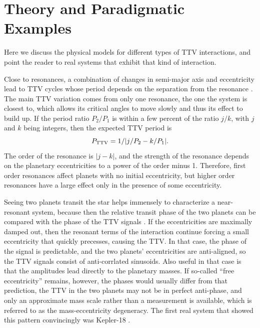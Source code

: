 \documentclass[graybox,natbib,nosecnum]{svmult}
\begin{document}
\section{Theory and Paradigmatic Examples} 

Here we discuss the physical models for different types of TTV interactions, and point the reader to real systems that exhibit that kind of interaction. 

Close to resonances, a combination of changes in semi-major axis and eccentricity lead to TTV cycles whose period depends on the separation from the resonance \citep{2012ApJ...761..122L}.  The main TTV variation comes from only one resonance, the one the system is closest to, which allows its critical angles to move slowly and thus its effect to build up.  If the period ratio $P_2/P_1$ is within a few percent of the ratio $j/k$, with $j$ and $k$ being integers, then the expected TTV period is 
\begin{equation}
P_{\rm TTV} = 1/|j/P_2-k/P_1|. \label{eqn:pttv}
\end{equation}
The order of the resonance is $|j-k|$, and the strength of the resonance depends on the planetary eccentricities to a power of the order minus 1.  Therefore, first order resonances affect planets with no initial eccentricity, but higher order resonances have a large effect only in the presence of some eccentricity. 

Seeing two planets transit the star helps immensely to characterize a near-resonant system, because then the relative transit phase of the two planets can be compared with the phase of the TTV signals \citep{2012ApJ...761..122L}.  If the eccentricities are maximally damped out, then the resonant terms of the interaction continue forcing a small eccentricity that quickly precesses, causing the TTV.  In that case, the phase of the signal is predictable, and the two planets' eccentricities are anti-aligned, so the TTV signals consist of anti-corrlated sinusoids.  Also useful in that case is that the amplitudes lead directly to the planetary masses.  If so-called ``free eccentricity'' remains, however, the phases would usually differ from that prediction, the TTV in the two planets may not be in perfect anti-phase, and only an approximate mass scale rather than a measurement is available, which is referred to as the mass-eccentricity degeneracy.  The first real system that showed this pattern convincingly was Kepler-18 \citep{2011ApJS..197....7C}. %
\end{document}

